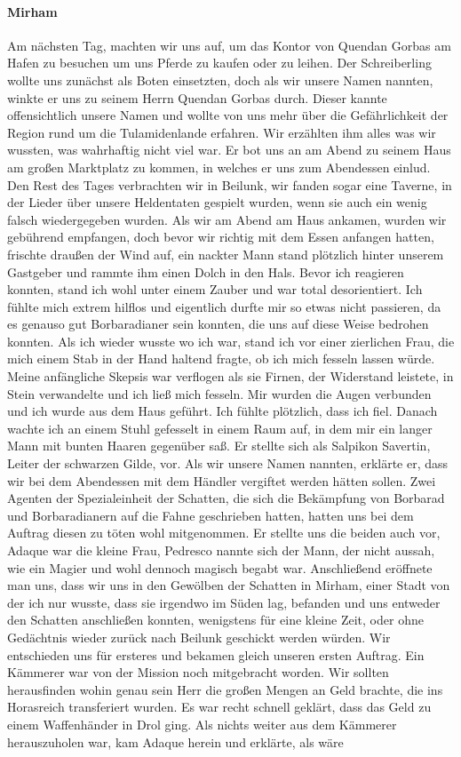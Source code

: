 \paragraph{Mirham}
Am nächsten Tag, machten wir uns auf, um das Kontor von Quendan Gorbas am Hafen zu besuchen um uns Pferde zu kaufen oder zu leihen. Der Schreiberling wollte uns zunächst als Boten einsetzten, doch als wir unsere Namen nannten, winkte er uns zu seinem Herrn Quendan Gorbas durch. Dieser kannte offensichtlich unsere Namen und wollte von uns mehr über die Gefährlichkeit der Region rund um die Tulamidenlande erfahren. Wir erzählten ihm alles was wir wussten, was wahrhaftig nicht viel war. Er bot uns an am Abend zu seinem Haus am großen Marktplatz zu kommen, in welches er uns zum Abendessen einlud. Den Rest des Tages verbrachten wir in Beilunk, wir fanden sogar eine Taverne, in der Lieder über unsere Heldentaten gespielt wurden, wenn sie auch ein wenig falsch wiedergegeben wurden. Als wir am Abend am Haus ankamen, wurden wir gebührend empfangen, doch bevor wir richtig mit dem Essen anfangen hatten, frischte draußen der Wind auf, ein nackter Mann stand plötzlich hinter unserem Gastgeber und rammte ihm einen Dolch in den Hals. Bevor ich reagieren konnten, stand ich wohl unter einem Zauber und war total desorientiert. Ich fühlte mich extrem hilflos und eigentlich durfte mir so etwas nicht passieren, da es genauso gut Borbaradianer sein konnten, die uns auf diese Weise bedrohen konnten. Als ich wieder wusste wo ich war, stand ich vor einer zierlichen Frau, die mich einem Stab in der Hand haltend fragte, ob ich mich fesseln lassen würde. Meine anfängliche Skepsis war verflogen als sie Firnen, der Widerstand leistete, in Stein verwandelte und ich ließ mich fesseln. Mir wurden die Augen verbunden und ich wurde aus dem Haus geführt. Ich fühlte plötzlich, dass ich fiel. Danach wachte ich an einem Stuhl gefesselt in einem Raum auf, in dem mir ein langer Mann mit bunten Haaren gegenüber saß. Er stellte sich als Salpikon Savertin, Leiter der schwarzen Gilde, vor. Als wir unsere Namen nannten, erklärte er, dass wir bei dem Abendessen mit dem Händler vergiftet werden hätten sollen. Zwei Agenten der Spezialeinheit der Schatten, die sich die Bekämpfung von Borbarad und Borbaradianern auf die Fahne geschrieben hatten, hatten uns bei dem Auftrag diesen zu töten wohl mitgenommen. Er stellte uns die beiden auch vor, Adaque war die kleine Frau, Pedresco nannte sich der Mann, der nicht aussah, wie ein Magier und wohl dennoch magisch begabt war. Anschließend eröffnete man uns, dass wir uns in den Gewölben der Schatten in Mirham, einer Stadt von der ich nur wusste, dass sie irgendwo im Süden lag, befanden und uns entweder den Schatten anschließen konnten, wenigstens für eine kleine Zeit, oder ohne Gedächtnis wieder zurück nach Beilunk geschickt werden würden. Wir entschieden uns für ersteres und bekamen gleich unseren ersten Auftrag. Ein Kämmerer war von der Mission noch mitgebracht worden. Wir sollten herausfinden wohin genau sein Herr die großen Mengen an Geld brachte, die ins Horasreich transferiert wurden. Es war recht schnell geklärt, dass das Geld zu einem Waffenhänder in Drol ging. Als nichts weiter aus dem Kämmerer herauszuholen war, kam Adaque herein und erklärte, als wäre 